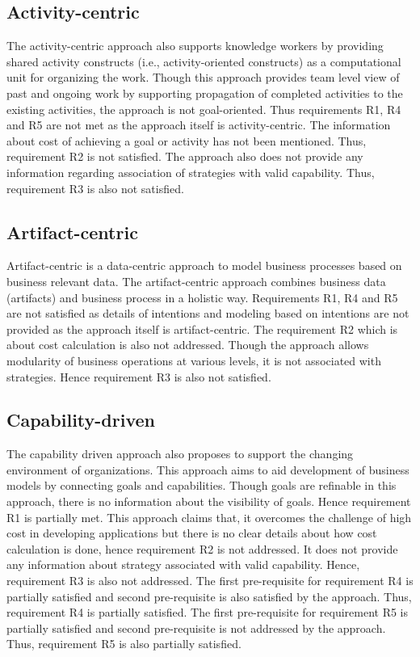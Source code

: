 \subsection{Activity-centric} 
The activity-centric approach also supports knowledge workers by providing shared activity constructs (i.e., activity-oriented constructs) as a computational unit for organizing the work. Though this approach provides team level view of past and ongoing work by supporting propagation of completed activities to the existing activities, the approach is not goal-oriented. Thus requirements R1, R4 and R5 are not met as the approach itself is activity-centric. The information about cost of achieving a goal or activity has not been mentioned. Thus, requirement R2 is not satisfied. The approach also does not provide any information regarding association of strategies with valid capability. Thus, requirement R3 is also not satisfied.   
 
\subsection{Artifact-centric} 
Artifact-centric is a data-centric approach to model business processes based on business relevant data. The artifact-centric approach combines business data (artifacts) and business process in a holistic way. Requirements R1, R4 and R5 are not satisfied as details of intentions and modeling based on intentions are not provided as the approach itself is artifact-centric. The requirement R2 which is about cost calculation is also not addressed. Though the approach allows modularity of business operations at various levels, it is not associated with strategies. Hence requirement R3 is also not satisfied. 

\subsection{Capability-driven} 
The capability driven approach also proposes to support the changing environment of organizations. This approach aims to aid development of business models by connecting goals and capabilities. Though goals are refinable in this approach, there is no information about the visibility of goals. Hence requirement R1 is partially met. This approach claims that, it overcomes the challenge of high cost in developing applications but there is no clear details about how cost calculation is done, hence requirement R2 is not addressed. It does not provide any information about strategy associated with valid capability. Hence, requirement R3 is also not addressed. The first pre-requisite for requirement R4 is partially satisfied and second pre-requisite is also satisfied by the approach. Thus, requirement R4 is partially satisfied. The first pre-requisite for requirement R5 is partially satisfied and second pre-requisite is not addressed by the approach. Thus, requirement R5 is also partially satisfied. 

